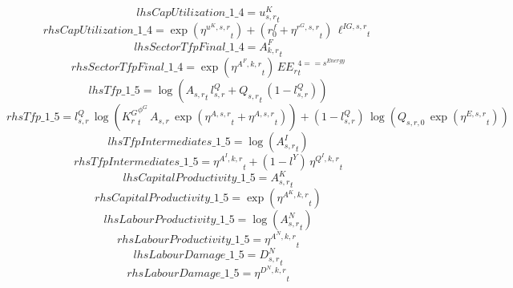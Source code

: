 \begin{dmath*}
lhsCapUtilization\_1\_4 = {{u^K_{s,r}}}_{t}
\end{dmath*}
\begin{dmath*}
rhsCapUtilization\_1\_4 = \exp\left({{\eta^{u^K,s,r}}}_{t}\right)+\left({{r^f_0}}+{{\eta^{r^G,s,r}}}_{t}\right)\, {{\ell^{IG,s,r}}}_{t}
\end{dmath*}
\begin{dmath*}
lhsSectorTfpFinal\_1\_4 = {{A^{F}_{k,r}}}_{t}
\end{dmath*}
\begin{dmath*}
rhsSectorTfpFinal\_1\_4 = \exp\left({{\eta^{A^F,k,r}}}_{t}\right)\, {{EE_r}}_{t}^{4=={{s^{Energy}}}}
\end{dmath*}
\begin{dmath*}
lhsTfp\_1\_5 = \log\left({{A_{s,r}}}_{t}\, {{l^{Q}_{s,r}}}+{{Q_{s,r}}}_{t}\, \left(1-{{l^{Q}_{s,r}}}\right)\right)
\end{dmath*}
\begin{dmath*}
rhsTfp\_1\_5 = {{l^{Q}_{s,r}}}\, \log\left({{K^G_{r}}}_{t}^{{{\phi^{G}}}}\, {{A_{s,r}}}\, \exp\left({{\eta^{A,s,r}}}_{t}+{{\eta^{A,s,r}}}_{t}\right)\right)+\left(1-{{l^{Q}_{s,r}}}\right)\, \log\left({{Q_{s,r,0}}}\, \exp\left({{\eta^{E,s,r}}}_{t}\right)\right)
\end{dmath*}
\begin{dmath*}
lhsTfpIntermediates\_1\_5 = \log\left({{A^{I}_{s,r}}}_{t}\right)
\end{dmath*}
\begin{dmath*}
rhsTfpIntermediates\_1\_5 = {{\eta^{A^{I},k,r}}}_{t}+\left(1-{{l^{Y}}}\right)\, {{\eta^{Q^{I},k,r}}}_{t}
\end{dmath*}
\begin{dmath*}
lhsCapitalProductivity\_1\_5 = {{A^{K}_{s,r}}}_{t}
\end{dmath*}
\begin{dmath*}
rhsCapitalProductivity\_1\_5 = \exp\left({{\eta^{A^{K},k,r}}}_{t}\right)
\end{dmath*}
\begin{dmath*}
lhsLabourProductivity\_1\_5 = \log\left({{A^{N}_{s,r}}}_{t}\right)
\end{dmath*}
\begin{dmath*}
rhsLabourProductivity\_1\_5 = {{\eta^{A^{N},k,r}}}_{t}
\end{dmath*}
\begin{dmath*}
lhsLabourDamage\_1\_5 = {{D^N_{s,r}}}_{t}
\end{dmath*}
\begin{dmath*}
rhsLabourDamage\_1\_5 = {{\eta^{D^{N},k,r}}}_{t}
\end{dmath*}

